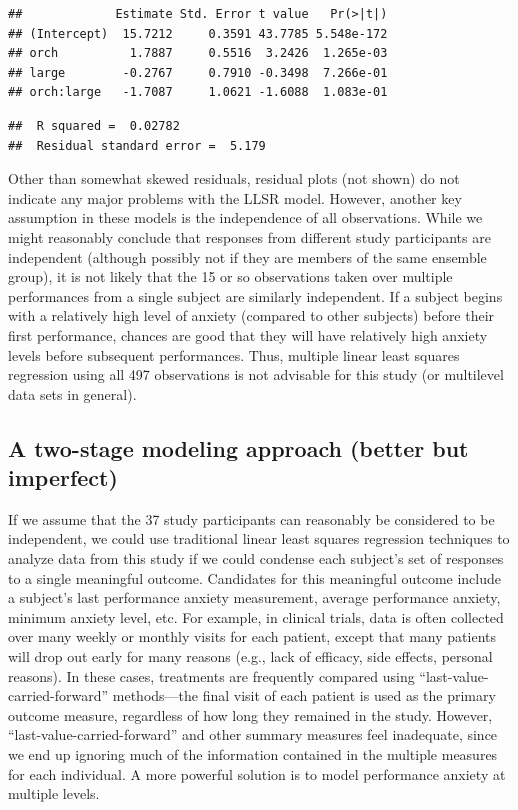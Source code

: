 \documentclass[
]{krantz}
\begin{document}
\begin{verbatim}
##             Estimate Std. Error t value   Pr(>|t|)
## (Intercept)  15.7212     0.3591 43.7785 5.548e-172
## orch          1.7887     0.5516  3.2426  1.265e-03
## large        -0.2767     0.7910 -0.3498  7.266e-01
## orch:large   -1.7087     1.0621 -1.6088  1.083e-01
\end{verbatim}

\begin{verbatim}
##  R squared =  0.02782 
##  Residual standard error =  5.179
\end{verbatim}

Other than somewhat skewed residuals, residual plots (not shown) do not indicate any major problems with the LLSR model. However, another key assumption in these models is the independence of all observations. While we might reasonably conclude that responses from different study participants are independent (although possibly not if they are members of the same ensemble group), it is not likely that the 15 or so observations taken over multiple performances from a single subject are similarly independent. If a subject begins with a relatively high level of anxiety (compared to other subjects) before their first performance, chances are good that they will have relatively high anxiety levels before subsequent performances. Thus, multiple linear least squares regression using all 497 observations is not advisable for this study (or multilevel data sets in general).

\hypertarget{twostage}{%
\subsection{A two-stage modeling approach (better but imperfect)}\label{twostage}}

If we assume that the 37 study participants can reasonably be considered to be independent, we could use traditional linear least squares regression techniques to analyze data from this study if we could condense each subject's set of responses to a single meaningful outcome. Candidates for this meaningful outcome include a subject's last performance anxiety measurement, average performance anxiety, minimum anxiety level, etc. For example, in clinical trials, data is often collected over many weekly or monthly visits for each patient, except that many patients will drop out early for many reasons (e.g., lack of efficacy, side effects, personal reasons). In these cases, treatments are frequently compared using ``last-value-carried-forward'' methods---the final visit of each patient is used as the primary outcome measure, regardless of how long they remained in the study. However, ``last-value-carried-forward'' and other summary measures feel inadequate, since we end up ignoring much of the information contained in the multiple measures for each individual. A more powerful solution is to model performance anxiety at multiple levels.
\end{document}
